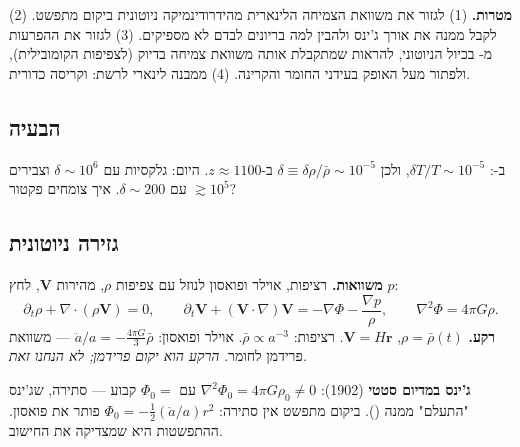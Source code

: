 
\begin{goalbox}
\textbf{מטרות.} (1) לגזור את משוואת הצמיחה הלינארית מהידרודינמיקה ניוטונית ביקום מתפשט. (2) לקבל ממנה את אורך ג'ינס ולהבין למה בריונים לבדם לא מספיקים. (3) לגזור את ההפרעות מ- בכיול הניוטוני, להראות שמתקבלת אותה משוואת צמיחה בדיוק (לצפיפות הקומובילית), ולפתור מעל האופק בעידני החומר והקרינה. (4) ממבנה לינארי לרשת:  וקריסה כדורית.
\end{goalbox}

\subsection{הבעיה}
ב-: $\delta T/T\sim10^{-5}$, ולכן $\delta\equiv\delta\rho/\bar\rho\sim10^{-5}$ ב-$z\approx1100$. היום: גלקסיות עם $\delta\sim10^{6}$ וצבירים עם $\delta\sim200$. איך צומחים פקטור $\gtrsim10^5$?

\subsection{גזירה ניוטונית}
\textbf{משוואות.} רציפות, אוילר ופואסון לנוזל עם צפיפות $\rho$, מהירות $\mathbf V$, לחץ $p$:
\begin{equation}
\partial_t\rho+\nabla\!\cdot(\rho\mathbf V)=0,\qquad
\partial_t\mathbf V+(\mathbf V\!\cdot\!\nabla)\mathbf V=-\nabla\Phi-\frac{\nabla p}{\rho},\qquad
\nabla^2\Phi=4\pi G\rho .
\end{equation}
\textbf{רקע.} $\rho=\bar\rho(t)$, $\mathbf V=H\mathbf r$. רציפות: $\bar\rho\propto a^{-3}$. אוילר ופואסון: $\ddot a/a=-\tfrac{4\pi G}{3}\bar\rho$ --- משוואת פרידמן לחומר. \emph{הרקע הוא יקום פרידמן; לא הנחנו זאת.}

\begin{warnbox}
\textbf{ג'ינס במדיום סטטי} (1902): $\nabla^2\Phi_0=4\pi G\rho_0\neq0$ עם $\Phi_0=$ קבוע --- סתירה, שג'ינס "התעלם" ממנה (). ביקום מתפשט אין סתירה: $\Phi_0=-\tfrac12(\ddot a/a)r^2$ פותר את פואסון. ההתפשטות היא שמצדיקה את החישוב.
\end{warnbox}

